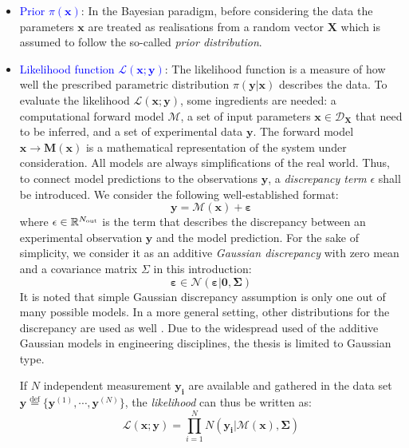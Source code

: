 \begin{itemize}[left=0pt]
    \item \textcolor{blue}{Prior $\pi(\boldsymbol{x})$}: In the Bayesian paradigm, before considering the data the parameters $\boldsymbol{x}$ are treated as realisations from a random vector $\boldsymbol{X}$ which is assumed to follow the so-called \textit{prior distribution}.

    \item \textcolor{blue}{Likelihood function $\mathcal{L}(\boldsymbol{x};\boldsymbol{y})$}: The likelihood function is a measure of how well the prescribed parametric distribution $\pi(\boldsymbol{y}|\boldsymbol{x})$ describes the data. To evaluate the likelihood $\mathcal{L}(\boldsymbol{x};\boldsymbol{y})$, some ingredients are needed: a computational forward model $\mathcal{M}$, a set of input parameters $\boldsymbol{x} \in\mathcal{D}_{\boldsymbol{X}}$ that need to be inferred, and a set of experimental data $\boldsymbol{y}$.
    The forward model $\boldsymbol{x} \rightarrow \boldsymbol{M}(\boldsymbol{x})$ is a mathematical representation of the system under consideration. All models are always simplifications of the real world. Thus, to connect model predictions to the observations $\boldsymbol{y}$, a \textit{discrepancy term} $\epsilon$ shall be introduced. We consider the following well-established format:
    \begin{equation}
        \label{eq: discrepancy term}
        \boldsymbol{y} = \mathcal{M}(\boldsymbol{x}) + \boldsymbol{\varepsilon}
    \end{equation}
    where $\epsilon \in \mathbb{R}^{N_{\rm{out}}}$ is the term that describes the discrepancy between an experimental observation $\boldsymbol{y}$ and the model prediction. For the sake of simplicity, we consider it as an additive \textit{Gaussian discrepancy} with zero mean and a covariance matrix $\Sigma$ in this introduction:
        \begin{equation}
            \label{eq: Gaussian discrepancy}
            \boldsymbol{\varepsilon} \in \mathcal{N}(\boldsymbol{\varepsilon}|\boldsymbol{0},\boldsymbol{\Sigma})
        \end{equation}
    It is noted that simple Gaussian discrepancy assumption is only one out of many possible models. In a more general setting, other distributions for the discrepancy are used as well \citep{UQdoc}. Due to the widespread used of the additive Gaussian models in engineering disciplines, the thesis is limited to Gaussian type.

    If $N$ independent measurement $\boldsymbol{y_{i}}$ are available and gathered in the data set $\boldsymbol{y} \stackrel{\mathrm{def}}{=} \{{\boldsymbol{y}^{(1)}},\cdots,{\boldsymbol{y}^{(N)}}\}$, the \textit{likelihood } can thus be written as:
        \begin{equation}
        \label{eq: single_Gaussian_discrepancy}
        \mathcal{L}(\boldsymbol{x};\boldsymbol{y}) = \prod_{i=1}^{N} N(\boldsymbol{y_{i}}|\mathcal{M}(\boldsymbol{x}),\boldsymbol{\Sigma})
        \end{equation}      
\end{itemize}


